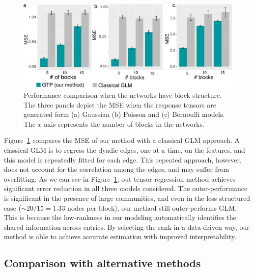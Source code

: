 \documentclass[12pt]{article}
\theoremstyle{plain}
\theoremstyle{definition}
\begin{document}
\begin{figure}[tb]
\centering
\includegraphics[width=15cm]{comparison.pdf}
\caption{Performance comparison when the networks have block structure. The three panels depict the MSE when the response tensors are generated form (a) Gaussian (b) Poisson and (c) Bernoulli models. The $x$-axis represents the number of blocks in the networks. }\label{fig:glm}
\end{figure}


Figure~\ref{fig:glm} compares the MSE of our method with a classical GLM approach. A classical GLM is to regress the dyadic edges, one at a time, on the features, and this model is repeatedly fitted for each edge. This repeated approach, however, does not account for the correlation among the edges, and may suffer from overfitting. As we can see in Figure~\ref{fig:glm}, out tensor regression method achieves significant error reduction in all three models considered. The outer-performance is significant in the presence of large communities, and even in the less structured case ($\sim 20/15=1.33$ nodes per block), our method still outer-performs GLM. This is because the low-rankness in our modeling automatically identifies the shared information across entries. By selecting the rank in a data-driven way, our method is able to achieve accurate estimation with improved interpretability. 

\subsection{Comparison with alternative methods}
\end{document}
